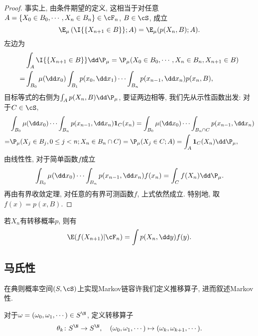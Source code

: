 \documentclass[a4paper, 10pt]{ctexart}
\begin{document}
\begin{proof}
	事实上, 由条件期望的定义, 这相当于对任意$A = \{X_0 \in B_0, \cdots, X_n \in B_n\} \in \cF_n$, $B \in \cS$, 成立
	\begin{equation*}
		\E_{\mu} \left( \I{\{X_{n+1} \in B\}}; A \right) 
		= \E_{\mu} (p(X_n, B); A). 
	\end{equation*}
	左边为
	\begin{align*}
		&\int_{A} \I{\{X_{n+1} \in B\}} \dd \P_{\mu} 
		= \P_{\mu} (X_0 \in B_0, \cdots, X_n \in B_n, X_{n+1} \in B) \\
		=& \int_{B_0} \mu(\dd x_0) \int_{B_1} p(x_0, \dd x_1) \cdots \int_{B_n} p(x_{n-1}, \dd x_{n}) p(x_n,B), 
	\end{align*}
	目标等式的右侧为$\int_A p(X_n, B) \dd \P_{\mu}$, 要证两边相等, 我们先从示性函数出发: 对于$C \in \cS$, 
	\begin{align*}
		&\int_{B_0} \mu(\dd x_0) \cdots \int_{B_n} p(x_{n-1}, \dd x_{n}) \mathbf{1}_C(x_n)
		= \int_{B_0} \mu(\dd x_0) \cdots \int_{B_n \cap C} p(x_{n-1}, \dd x_{n})\\
		=&\P_{\mu}(X_j \in B_j, 0 \leq j < n; X_n \in B_n \cap C)
		= \P_{\mu}(X_j \in C; A)
		= \int_A \mathbf{1}_{C}(X_n) \dd \P_{\mu}, 
	\end{align*}
	由线性性, 对于简单函数$f$成立
	\begin{equation*}
		\int_{B_0} \mu(\dd x_0) \cdots \int_{B_n} p(x_{n-1}, \dd x_{n}) f(x_n)
		= \int_C f(X_n) \dd \P_{\mu}. 
	\end{equation*}
	再由有界收敛定理, 对任意的有界可测函数$f$, 上式依然成立. 
	特别地, 取$f(x) = p(x, B)$.
\end{proof}

 若$X_n$有转移概率$p$, 则有
\begin{equation}
	\E(f(X_{n+1})|\cF_n) = \int p(X_n, \dd y) f(y). 
\end{equation}



\subsection{马氏性}

\noindent
在典则概率空间$(S, \cS)$上实现Markov链容许我们定义推移算子, 进而叙述Markov性. 
\begin{definition}[推移算子]
	对于$\omega = (\omega_0, \omega_1, \cdots) \in S^{\N}$, 定义转移算子
	\begin{equation*}
		\theta_k \colon S^{\N} \to S^{\N}, \quad
		(\omega_0, \omega_1, \cdots) \mapsto (\omega_k, \omega_{k+1}, \cdots). 
	\end{equation*}
\end{definition}
\end{document}
